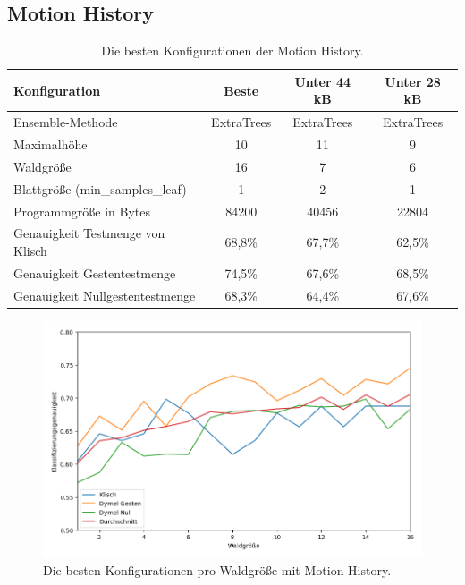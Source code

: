 \subsection{Motion History}
\begin{table}[h!]
    \centering
    \begin{tabular}{ | l | c | c | c |}
        \hline
        Konfiguration & Beste & Unter 44 kB & Unter 28 kB \\\hline
        Ensemble-Methode & ExtraTrees & ExtraTrees & ExtraTrees \\\hline
        Maximalhöhe & 10 & 11 & 9 \\\hline
        Waldgröße & 16 & 7 & 6 \\\hline
        Blattgröße (min\_samples\_leaf) & 1 & 2 & 1 \\\hline
        Programmgröße in Bytes & 84200 & 40456 & 22804 \\\hline
        Genauigkeit Testmenge von Klisch & 68,8\% & 67,7\% & 62,5\% \\\hline
        Genauigkeit Gestentestmenge & 74,5\% & 67,6\% & 68,5\% \\\hline
        Genauigkeit Nullgestentestmenge & 68,3\% & 64,4\% & 67,6\% \\\hline
    \end{tabular}
    \caption{Die besten Konfigurationen der Motion History.}
    \label{tab:motion_history}
\end{table}
\begin{figure}[h!]
    \centering
    \includegraphics[width=\linewidth]{images/motion_history_acc_per_size.png}
    \caption{Die besten Konfigurationen pro Waldgröße mit Motion History.}
    \label{fig:motion_history_per_forest_size}
\end{figure}
